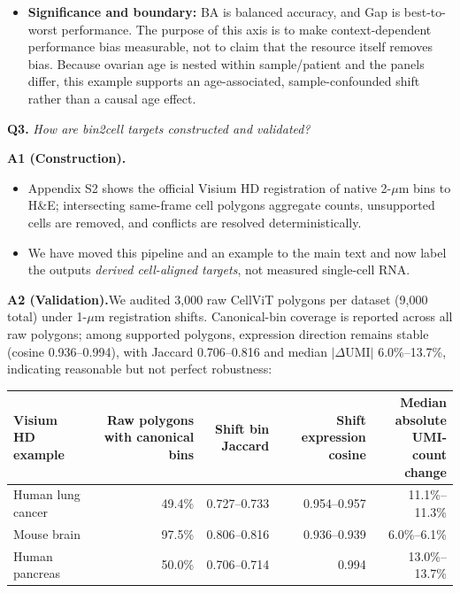 \documentclass[10pt]{article}
\newcommand{\questionsep}{\par\vspace{1.25em}}
\begin{document}
\begin{itemize}
\item \textbf{Significance and boundary:} BA is balanced accuracy, and Gap is
best-to-worst performance. The purpose of this axis is to make
context-dependent performance bias measurable, not to claim that the resource
itself removes bias. Because ovarian age is nested within sample/patient and the
panels differ, this example supports an age-associated, sample-confounded shift
rather than a causal age effect.
\end{itemize}

\questionsep
\textbf{Q3.}\quad
\textit{How are bin2cell targets constructed and validated?}

\textbf{A1 (Construction).}
\begin{itemize}
\item Appendix S2 shows the official Visium HD registration of native
2-\(\mu\)m bins to H\&E; intersecting same-frame cell polygons aggregate counts,
unsupported cells are removed, and conflicts are resolved deterministically.
\item We have moved this pipeline and an example to the main text and now label
the outputs \emph{derived cell-aligned targets}, not measured single-cell RNA.
\end{itemize}

\textbf{A2 (Validation).}\enspace We audited 3,000 raw CellViT polygons per
dataset (9,000 total) under 1-\(\mu\)m registration shifts. Canonical-bin
coverage is reported across all raw polygons; among supported polygons,
expression direction remains stable (cosine 0.936--0.994), with Jaccard
0.706--0.816 and median \( |\Delta\mathrm{UMI}| \) 6.0\%--13.7\%, indicating
reasonable but not perfect robustness:

\begin{center}
\begingroup
\scriptsize
\setlength{\tabcolsep}{2pt}
\renewcommand{\arraystretch}{1.05}
\begin{tabularx}{\linewidth}{@{}Xrrrr@{}}
\toprule
Visium HD example & Raw polygons with canonical bins & Shift bin Jaccard &
Shift expression cosine & \shortstack{Median absolute\\UMI-count change} \\
\midrule
Human lung cancer & 49.4\% & 0.727--0.733 & 0.954--0.957 & 11.1\%--11.3\% \\
Mouse brain & 97.5\% & 0.806--0.816 & 0.936--0.939 & 6.0\%--6.1\% \\
Human pancreas & 50.0\% & 0.706--0.714 & 0.994 & 13.0\%--13.7\% \\
\bottomrule
\end{tabularx}
\endgroup
\end{center}
\end{document}
